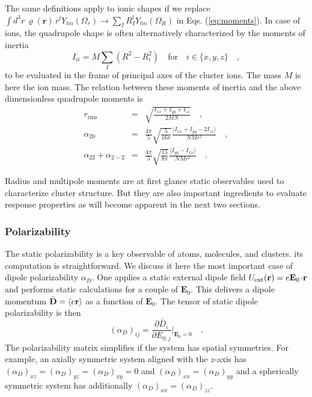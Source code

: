 \documentclass[final,1p]{elsarticle}
\begin{document}
The same definitions apply to ionic shapes if we replace $\int
d^3r\,\varrho(\mathbf{r})\,r^lY_{lm}(\Omega_r)
\longrightarrow\sum_IR_I^lY_{lm}(\Omega_R)$ in
Eqs. (\ref{eq:moments}).
In case of ions, 
the quadrupole shape is often alternatively characterized by the
moments of inertia
\begin{equation}
  I_{ii}=M\sum_I\left(R^2_{\mbox{}}-R_i^2\right)
  \quad\mbox{for}\quad
  i\in\{x,y,z\}
  \quad,
\end{equation}
to be evaluated in the frame of principal axes of the cluster ions.  The
mass $M$ is here the ion mass.
The relation between these moments of inertia and the 
above dimensionless quadrupole moments is
\begin{subequations}
\begin{eqnarray}
  r_\mathrm{rms}
  &=&
  \sqrt{\frac{I_{xx}+I_{yy}+I_{zz}}{2MN}}
  \quad,
\\
  \alpha_{20}
  &=&
  \frac{4\pi}{5}\sqrt{\frac{5}{16\pi}}
  \frac{\langle I_{xx}+I_{yy}-2I_{zz}\rangle}{NMr^2}
  \quad,
\\
  \alpha_{22}+\alpha_{2-2}
  &=&
  \frac{4\pi}{5}\sqrt{\frac{15}{8\pi}}
  \frac{\langle I_{yy}-I_{xx}\rangle}{NMr^2}
  \quad.
\end{eqnarray}
\end{subequations}

Radius and multipole moments are at first glance static observables
used to characterize cluster structure. But they are also important
ingredients to evaluate response properties as will become apparent in
the next two sections.


\subsubsection{Polarizability}
\label{sec:comppol}

The static polarizability is a key observable of atoms, molecules, and
clusters.  its computation is straightforward.  We discuss it here the
most important case of dipole polarizability $\alpha_D$.  One applies
a static external dipole field
$U_\mathrm{ext}(\mathbf{r})=e\mathbf{E}_0\!\cdot\!{\bf r}$ and
performs static calculations for a couple of $\mathbf{E}_0$.  This
delivers a dipole momentum $\bar{\bf D}=\langle e\mathbf{r}\rangle$ as
a function of $\mathbf{E}_0$. The tensor of static dipole
polarizability is then
\begin{equation}
  (\alpha_D)_{ij}
  =
  \frac{\partial\bar{D}_i}{\partial{E}_{0,j}}\Big|_{\mathbf{E}_0=0}
  \quad.
\label{eq:comppolar}
\end{equation}
The polarizability matrix simplifies if the system has spatial
symmetries. For example, an axially symmetric system aligned with the $z$-axis
has $(\alpha_D)_{xz}=(\alpha_D)_{yz}=(\alpha_D)_{xy}=0$ and
$(\alpha_D)_{xx}=(\alpha_D)_{yy}$ and a spherically symmetric system
has additionally $(\alpha_D)_{xx}=(\alpha_D)_{zz}$.
\end{document}
